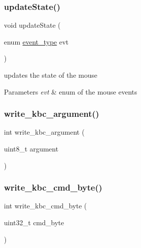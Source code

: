 \subsubsection{\texorpdfstring{updateState()}{updateState()}}
{\footnotesize\ttfamily void update\+State (\begin{DoxyParamCaption}\item[{enum \mbox{\hyperlink{group__mouse_ga430b444c74dd3fd1472a31714ec5f1ce}{event\+\_\+type}}}]{evt }\end{DoxyParamCaption})}



updates the state of the mouse 


\begin{DoxyParams}{Parameters}
{\em evt} & enum of the mouse events \\
\hline
\end{DoxyParams}
\mbox{\label{group__mouse_gaa581647856759c0789e39e87beb056c0}} 
\subsubsection{\texorpdfstring{write\_kbc\_argument()}{write\_kbc\_argument()}}
{\footnotesize\ttfamily int write\+\_\+kbc\+\_\+argument (\begin{DoxyParamCaption}\item[{uint8\+\_\+t}]{argument }\end{DoxyParamCaption})}

\mbox{\label{group__mouse_gae71de5cc3d84045784f84fb32e0c4bd3}} 
\subsubsection{\texorpdfstring{write\_kbc\_cmd\_byte()}{write\_kbc\_cmd\_byte()}}
{\footnotesize\ttfamily int write\+\_\+kbc\+\_\+cmd\+\_\+byte (\begin{DoxyParamCaption}\item[{uint32\+\_\+t}]{cmd\+\_\+byte }\end{DoxyParamCaption})}


